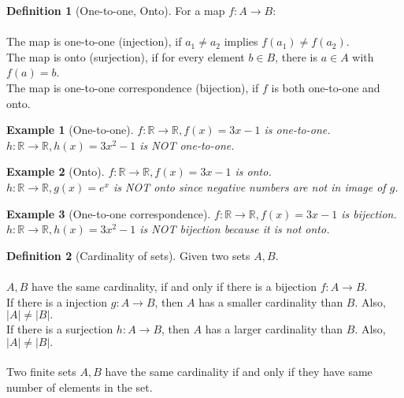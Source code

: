 \documentclass{article}
\theoremstyle{MyNonumberplain}
\theoremstyle{break}
\newcommand{\R}{\mathbb{R}}
\theoremstyle{break}
\newtheorem{example}{Example}[section]
\theoremstyle{break}
\theoremstyle{definition}
\theoremstyle{break}
\newtheorem{definition}{Definition}[section]
\begin{document}
\begin{defbox}
    \begin{definition}[One-to-one, Onto]
       For a map $f:A\to B$:\\\\
       The map is one-to-one (injection), if $a_1\neq a_2$ implies $f(a_1)\neq f(a_2)$.\\
       The map is onto (surjection), if for every element $b\in B$, there is $a\in A$ with $f(a)=b$. \\
       The map is one-to-one correspondence (bijection), if $f$ is both one-to-one and onto.
    \end{definition}
\end{defbox}

\begin{expbox}
    \begin{example}[One-to-one]
        $f:\R\to\R, f(x)=3x-1$ is one-to-one.\\
        $h:\R\to\R, h(x)=3x^2-1$ is NOT one-to-one.
    \end{example}
\end{expbox}

\begin{expbox}
    \begin{example}[Onto]
        $f:\R\to\R, f(x)=3x-1$ is onto.\\
        $h:\R\to\R, g(x)=e^x$ is NOT onto since negative numbers are not in image of $g$.
    \end{example}
\end{expbox}

\begin{expbox}
    \begin{example}[One-to-one correspondence]
        $f:\R\to\R, f(x)=3x-1$ is bijection.\\
        $h:\R\to\R, h(x)=3x^2-1$ is NOT bijection because it is not onto.
    \end{example}
\end{expbox}

\begin{defbox}
    \begin{definition}[Cardinality of sets]
        Given two sets $A,B$.\\\\
        $A,B$ have the same cardinality, if and only if there is a bijection $f:A\to B$.\\
        If there is a injection $g:A\to B$, then $A$ has a smaller cardinality than $B$. Also, $|A|\neq |B|.$\\
        If there is a surjection $h:A\to B$, then $A$ has a larger cardinality than $B$. Also, $|A|\neq |B|.$\\\\
        Two finite sets $A,B$ have the same cardinality if and only if they have same number of elements in the set. 
    \end{definition}
\end{defbox}
\end{document}

